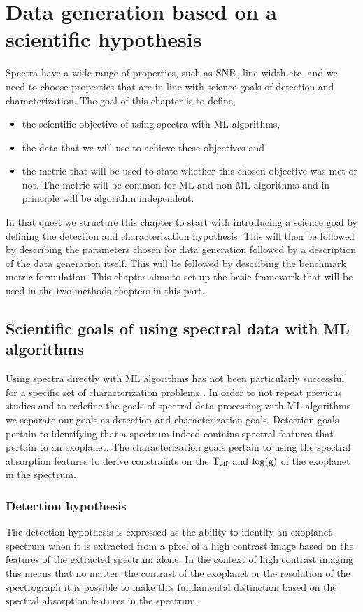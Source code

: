 \chapter{Data generation based on a scientific hypothesis}
\label{chap:III.3}
Spectra have a wide range of properties, such as $\rm{SNR}$, line width etc. and we need to choose properties that are in line with science goals of detection and characterization.
The goal of this chapter is to define,
\begin{itemize}
    \item the scientific objective of using spectra with ML algorithms, 
    \item the data that we will use to achieve these objectives and
    \item the metric that will be used to state whether this chosen objective was met or not.
The metric will be common for ML and non-ML algorithms and in principle will be algorithm independent.
\end{itemize}
In that quest we structure this chapter to start with introducing a science goal by defining the detection and characterization hypothesis.
This will then be followed by describing the parameters chosen for data generation followed by a description of the data generation itself.
This will be followed by describing the benchmark metric formulation.
This chapter aims to set up the basic framework that will be used in the two methods chapters in this part.

\section{Scientific goals of using spectral data with ML algorithms}
Using spectra directly with ML algorithms has not been particularly successful for a specific set of characterization problems \citep[e.g,][]{2020Fisher}.
In order to not repeat previous studies and to redefine the goals of spectral data processing with ML algorithms we separate our goals as detection and characterization goals.
Detection goals pertain to identifying that a spectrum indeed contains spectral features that pertain to an exoplanet.
The characterization goals pertain to using the spectral absorption features to derive constraints on the $\rm{T_{eff}}$ and $\log(\rm{g})$ of the exoplanet in the spectrum.
\subsection{Detection hypothesis}
The detection hypothesis is expressed as the ability to identify an exoplanet spectrum when it is extracted from a pixel of a high contrast image based on the features of the extracted spectrum alone.
In the context of high contrast imaging this means that no matter, the contrast of the exoplanet or the resolution of the spectrograph it is possible to make this fundamental distinction based on the spectral absorption features in the spectrum.

